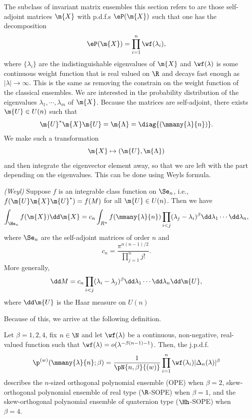 The subclass of invariant matrix ensembles this section refers to are those self-adjoint matrices $\m{X}$ with p.d.f.s $\eP(\m{X})$ such that one has the decomposition
\begin{equation}
	\eP(\m{X}) = \prod_{i=1}^n \wf(\lambda_i),
\end{equation}
where $\{\lambda_i\}$ are the indistinguishable eigenvalues of $\m{X}$ and $\wf(\lambda)$ is some continuous weight function that is real valued on $\R$ and decays fast enough as $|\lambda| \rightarrow \infty$. This is the same as removing the constrain on the weight function of the classical ensembles. We are interested in the probability distribution of the eigenvalues $\lambda_1, \cdots, \lambda_m$ of $\m{X}$. Because the matrices are self-adjoint, there exists $\m{U} \in U(n)$ such that
\begin{equation}
	\m{U}^* \m{X} \m{U} = \m{\Lambda} = \diag{(\mmany{\lambda}{n})}.
\end{equation} 
We make such a transformation
\begin{equation}
\m{X} \mapsto (\m{U}, \m{\Lambda})	
\end{equation}
and then integrate the eigenvector element away, so that we are left with the part depending on the eigenvalues. This can be done using Weyls formula.
\begin{teorema}
	\textit{(Weyl)} Suppose $f$ is an integrable class function on $\Se_n$, i.e., $f(\m{U} \m{X} \m{U}^*) = f(M)$ for all $\m{U} \in U(n)$. Then we have
	\begin{equation}
		\int_{\He_n} f(\m{X}) \dd \m{X} = c_n \int_{R^n} f(\mmany{\lambda}{n}) \prod_{i < j} (\lambda_j - \lambda_i)^\beta \dd \lambda_1 \cdots \dd \lambda_n,
	\end{equation}
	where $\Se_n$ are the self-adjoint matrices of order $n$ and
	\begin{equation}
		c_n = \frac{\pi^{n(n-1)/2}}{\prod_{j=1}^{n} j!}.
	\end{equation}
	More generally, 
	\begin{equation}
		\dd M = c_n \prod_{i < j} (\lambda_i - \lambda_j)^\beta  \dd \lambda_1 \cdots \dd \lambda_n \dd \m{U},
	\end{equation}
	where $\dd \m{U}$ is the Haar measure on $U(n)$
\end{teorema}
Because of this, we arrive at the following definition.
\begin{definicao}
	Let $\beta = 1, 2, 4$, fix $n \in \N$ and let $\wf(\lambda)$ be a continuous, non-negative, real-valued function such that $\wf(\lambda) = o(\lambda^{-\beta(n-1)-1})$. Then, the j.p.d.f.
	\begin{equation}
		\p^{(w)}(\mmany{\lambda}{n};\beta) = \frac{1}{\pN{n,\beta}{(w)}} \prod_{i=1}^{n} \wf(\lambda_i) |\Delta_n(\lambda)|^\beta
	\end{equation}
	describes the $n$-sized orthogonal polynomial ensemble (OPE) when $\beta = 2$, skew-orthogonal polynomial ensemble of real type ($\R$-SOPE) when $\beta=1$, and the skew-orthogonal polynomial ensemble of quaternion type ($\Hh$-SOPE) when $\beta = 4$.
	\label{Definition: measure-weight}
 \end{definicao}

